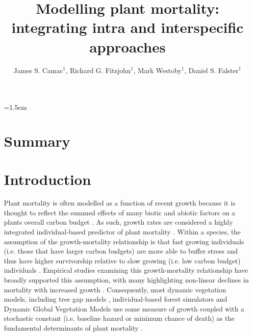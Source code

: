 \documentclass[a4paper,11pt]{article}\usepackage[]{graphicx}\usepackage[]{color}
\title{Modelling plant mortality: integrating intra and interspecific approaches}
\author{James S. Camac\textasteriskcentered$^1$, Richard G. Fitzjohn$^1$, Mark Westoby$^1$, Daniel S. Falster$^1$}
\affiliation{
$^1$ Department of Biological Sciences, Macquarie University, Sydney, NSW 2109, Australia\\
\textasteriskcentered Email for correspondence: \texttt{james.camac@gmail.com}\\
Word count: }
\date{}
\begin{document}
\mstitlepage
\noindent
\parindent=1.5em
\addtolength{\parskip}{.3em}
\doublespacing
\linenumbers

\section{Summary}\label{abstract}

\section{Introduction}
Plant mortality is often modelled as a function of recent growth because it is thought to reflect the summed effects of many biotic and abiotic factors on a plants overall carbon budget \citep{Kobe:1995tw, Hawkes:2000ib, Keane:2001db, Wyckoff:2002ul}. As such, growth rates are considered a highly integrated individual-based predictor of plant mortality \citep{Hawkes:2000ib}. Within a species, the assumption of the growth-mortality relationship is that fast growing individuals (i.e. those that have larger carbon budgets) are more able to buffer stress and thus have higher survivorship relative to slow growing (i.e. low carbon budget) individuals \citep{Hawkes:2000ib, Keane:2001db}. Empirical studies examining this growth-mortality relationship have broadly supported this assumption, with many highlighting non-linear declines in mortality with increased growth \citep[e.g.][]{Kobe:1997vy, Wyckoff:2002ul,Vieilledent:2010fv}. Consequently, most dynamic vegetation models, including tree gap models \citep{Keane:2001db}, individual-based forest simulators \citep[e.g. SORTIE][]{Pacala:1996vm} and Dynamic Global Vegetation Models \citep[DGVMs; ][]{Woodward:2004ft} use some measure of growth coupled with a stochastic constant (i.e. baseline hazard or minimum chance of death) as the fundamental determinants of plant mortality \citep{Hawkes:2000ib, McDowell:2011dr}. 
\end{document}

